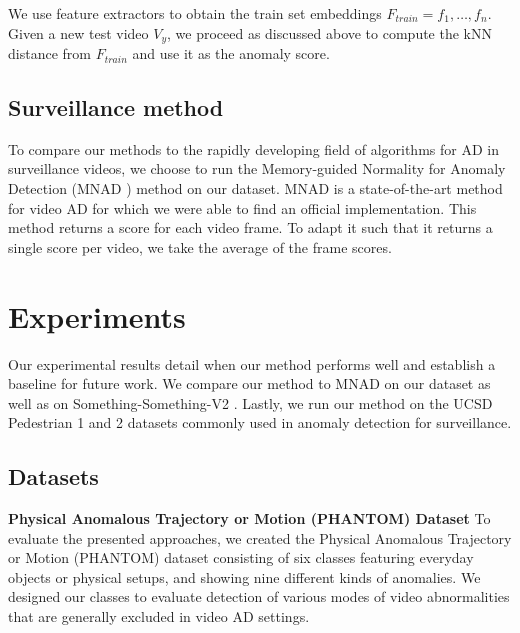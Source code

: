 \documentclass{article}
\begin{document}
We use feature extractors to obtain the train set embeddings $F_{train}=f_1,…,f_n$. Given a new test video 
$V_y$, we proceed as discussed above to compute the kNN distance from $F_{train}$ and use it as the anomaly score. 

\subsection{Surveillance method}
To compare our methods to the rapidly developing field of algorithms for AD in surveillance videos, we choose to run the Memory-guided Normality for Anomaly Detection (MNAD \cite{park2020learning}) method on our dataset. MNAD is a state-of-the-art method for video AD for which we were able to find an official implementation. This method returns a score for each video frame. To adapt it such that it returns a single score per video, we take the average of the frame scores. 





\section{Experiments}



\label{sec:experiments}
Our experimental results detail when our method performs well and establish a baseline for future work. We compare our method to MNAD on our dataset as well as on Something-Something-V2 \cite{goyal2017something}. Lastly, we run our method on the UCSD Pedestrian 1 and 2 \cite{mahadevan2010anomaly} datasets commonly used in anomaly detection for surveillance.

\subsection{Datasets}

\label{sec:datasets}

\textbf{Physical Anomalous Trajectory or Motion (PHANTOM) Dataset}
To evaluate the presented approaches, we created the Physical Anomalous Trajectory or Motion (PHANTOM) dataset consisting of six classes featuring everyday objects or physical setups, and showing nine different kinds of anomalies. We designed our classes to evaluate detection of various modes of video abnormalities that are generally excluded in video AD settings.  
\end{document}

